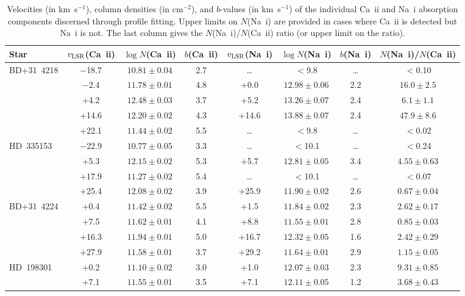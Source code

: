 \documentclass[fleqn,usenatbib]{mnras}
\begin{document}
\begin{table}
\centering
\caption{Velocities (in km~s$^{-1}$), column densities (in cm$^{-2}$), and $b$-values (in km~s$^{-1}$) of the individual Ca~{\sc ii} and Na~{\sc i} absorption components discerned through profile fitting. Upper limits on $N$(Na~{\sc i}) are provided in cases where Ca~{\sc ii} is detected but Na~{\sc i} is not. The last column gives the $N$(Na~{\sc i})/$N$(Ca~{\sc ii}) ratio (or upper limit on the ratio).}
\label{tab:components}
\begin{tabular}{lccccccc}
\hline
Star & $v_{\rm LSR}$(Ca~{\sc ii}) & $\log N$(Ca~{\sc ii}) & $b$(Ca~{\sc ii}) & $v_{\rm LSR}$(Na~{\sc i}) & $\log N$(Na~{\sc i}) & $b$(Na~{\sc i}) & $N$(Na~{\sc i})/$N$(Ca~{\sc ii}) \\
\hline
BD+31~4218 & $-$18.7 & $10.81\pm0.04$ & 2.7 & \ldots & $<$9.8 & \ldots & $<$0.10 \\
 & $-$2.4 & $11.78\pm0.01$ & 4.8 & +0.0 & $12.98\pm0.06$ & 2.2 & $16.0\pm2.5$ \\
 & +4.2 & $12.48\pm0.03$ & 3.7 & +5.2 & $13.26\pm0.07$ & 2.4 & $6.1\pm1.1$ \\
 & +14.6 & $12.20\pm0.02$ & 4.3 & +14.6 & $13.88\pm0.07$ & 2.4 & $47.9\pm8.6$ \\
 & +22.1 & $11.44\pm0.02$ & 5.5 & \ldots & $<$9.8 & \ldots & $<$0.02 \\
HD~335153 & $-$22.9 & $10.77\pm0.05$ & 3.3 & \ldots & $<$10.1 & \ldots & $<$0.24 \\
 & +5.3 & $12.15\pm0.02$ & 5.3 & +5.7 & $12.81\pm0.05$ & 3.4 & $4.55\pm0.63$ \\
 & +17.9 & $11.27\pm0.02$ & 5.4 & \ldots & $<$10.1 & \ldots & $<$0.07 \\
 & +25.4 & $12.08\pm0.02$ & 3.9 & +25.9 & $11.90\pm0.02$ & 2.6 & $0.67\pm0.04$ \\
BD+31~4224 & +0.4 & $11.42\pm0.02$ & 5.5 & +1.5 & $11.84\pm0.02$ & 2.3 & $2.62\pm0.17$ \\
 & +7.5 & $11.62\pm0.01$ & 4.1 & +8.8 & $11.55\pm0.01$ & 2.8 & $0.85\pm0.03$ \\
 & +16.3 & $11.94\pm0.01$ & 5.0 & +16.7 & $12.32\pm0.05$ & 1.6 & $2.42\pm0.29$ \\
 & +27.9 & $11.58\pm0.01$ & 3.7 & +29.2 & $11.64\pm0.01$ & 2.9 & $1.15\pm0.05$ \\
HD~198301 & +0.2 & $11.10\pm0.02$ & 3.0 & +1.0 & $12.07\pm0.03$ & 2.3 & $9.31\pm0.85$ \\
 & +7.1 & $11.55\pm0.01$ & 3.5 & +7.1 & $12.11\pm0.05$ & 1.2 & $3.68\pm0.43$ \\

\end{tabular}
\end{table}
\end{document}
